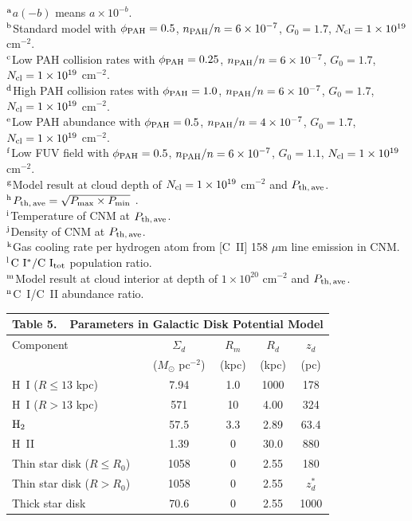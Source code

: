 \documentclass[12pt,preprint,flushrt]{aastex}
\newcommand{\pthave}{P_{\rm th,\,ave}}
\begin{document}
{\noindent
$^{\rm a}${$a(-b)$ means $a\times 10^{-b}$.}\\
$^{\rm b}${Standard model with $\phi_{\rm PAH} = 0.5$,
     $n_{\rm PAH}/n = 6\times 10^{-7}$, $G_0 = 1.7$,
     $N_{\rm cl} = 1\times 10^{19}$ cm$^{-2}$.}\\
$^{\rm c}${Low PAH collision rates with
      $\phi_{\rm PAH} = 0.25$, $n_{\rm PAH}/n = 6\times 10^{-7}$, $G_0 = 1.7$,
      $N_{\rm cl} = 1\times 10^{19}$ cm$^{-2}$.}\\
$^{\rm {d}}${High PAH collision rates with
       $\phi_{\rm PAH} = 1.0$, $n_{\rm PAH}/n = 6\times 10^{-7}$, $G_0 = 1.7$,
      $N_{\rm cl} = 1\times 10^{19}$ cm$^{-2}$.}\\
$^{\rm {e}}${Low PAH abundance with
      $\phi_{\rm PAH} = 0.5$, $n_{\rm PAH}/n = 4\times 10^{-7}$, $G_0 = 1.7$,
       $N_{\rm cl} = 1\times 10^{19}$ cm$^{-2}$.}\\
$^{\rm f}${Low FUV field with
       $\phi_{\rm PAH} = 0.5$, $n_{\rm PAH}/n = 6\times 10^{-7}$, $G_0 = 1.1$,
       $N_{\rm cl} = 1\times 10^{19}$ cm$^{-2}$.}\\
$^{\rm {g}}${Model result at cloud depth of
          $N_{\rm cl} = 1\times 10^{19}$ cm$^{-2}$ and $\pthave$.}\\
$^{\rm {h}}${$\pthave=\sqrt{P_{\rm max}\times P_{\rm min}}$\,\,.}\\
$^{\rm {i}}${Temperature of CNM at $\pthave$.}\\
$^{\rm {j}}${Density of CNM at $\pthave$.}\\
$^{\rm {k}}${Gas cooling rate per hydrogen atom 
from [C~II] 158 $\mu$m line emission in CNM.}\\
$^{\rm {l}}${${\rm C~I^*/C~I_{\rm tot}}$ population ratio.}\\
$^{\rm {m}}${Model result at cloud interior at depth of
         $1\times 10^{20}$ cm$^{-2}$ and $\pthave$.}\\
$^{\rm {n}}${C~I/C~II abundance ratio.}\\
}

\newpage
{}
\begin{tabular}{lcccc}
\multicolumn{5}{c}{Table 5.\ \ Parameters in Galactic Disk Potential Model\tablenotemark{a}
              \label{tbl:potential}} \\ \hline\hline
{Component} & {$\Sigma_d$} & {$R_m$} & {$R_d$} & {$z_d$} \\
{} & {($M_\odot$ pc$^{-2}$)\tablenotemark{b}}  & {(kpc)} & {(kpc)} &
{(pc)} \\ \hline

H~I ($R \le 13$ kpc) & 7.94 & 1.0 & 1000 & 178\\
H~I ($R > 13$ kpc) & 571 & 10 & 4.00 & 324\\
${\rm H_2}$ & 57.5 & 3.3 & 2.89 & 63.4 \\
H~II   & 1.39     & 0  & 30.0 & 880 \\
Thin star disk ($R \le R_0$) & 1058 & 0 & 2.55 & 180 \\
Thin star disk ($R  >  R_0$) & 1058 & 0 & 2.55 & $z_d^{*}$\tablenotemark{c} \\
Thick star disk & 70.6 & 0 & 2.55 & 1000 \\ \hline
\end{tabular}
\end{document}
